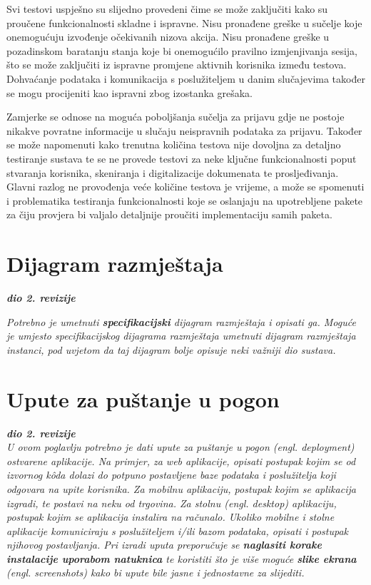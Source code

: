 			{Svi testovi uspješno su slijedno provedeni čime se može zaključiti kako su proučene funkcionalnosti skladne i ispravne. Nisu pronađene greške u sučelje koje onemogućuju izvođenje očekivanih nizova akcija. Nisu pronađene greške u pozadinskom baratanju stanja koje bi onemogućilo pravilno izmjenjivanja sesija, što se može zaključiti iz ispravne promjene aktivnih korisnika između testova. Dohvaćanje podataka i komunikacija s poslužiteljem u danim slučajevima također se mogu procijeniti kao ispravni zbog izostanka grešaka.}
				
			{Zamjerke se odnose na moguća poboljšanja sučelja za prijavu gdje ne postoje nikakve povratne informacije u slučaju neispravnih podataka za prijavu. Također se može napomenuti kako trenutna količina testova nije dovoljna za detaljno testiranje sustava te se ne provede testovi za neke ključne funkcionalnosti poput stvaranja korisnika, skeniranja i digitalizacije dokumenata te prosljeđivanja. Glavni razlog ne provođenja veće količine testova je vrijeme, a može se spomenuti i problematika testiranja funkcionalnosti koje se oslanjaju na upotrebljene pakete za čiju provjera bi valjalo detaljnije proučiti implementaciju samih paketa.}
			 
			\eject 
		
		
		\section{Dijagram razmještaja}
			
			\textbf{\textit{dio 2. revizije}}
			
			 \textit{Potrebno je umetnuti \textbf{specifikacijski} dijagram razmještaja i opisati ga. Moguće je umjesto specifikacijskog dijagrama razmještaja umetnuti dijagram razmještaja instanci, pod uvjetom da taj dijagram bolje opisuje neki važniji dio sustava.}
			
			\eject 
		
		\section{Upute za puštanje u pogon}
		
			\textbf{\textit{dio 2. revizije}}\\
		
			 \textit{U ovom poglavlju potrebno je dati upute za puštanje u pogon (engl. deployment) ostvarene aplikacije. Na primjer, za web aplikacije, opisati postupak kojim se od izvornog kôda dolazi do potpuno postavljene baze podataka i poslužitelja koji odgovara na upite korisnika. Za mobilnu aplikaciju, postupak kojim se aplikacija izgradi, te postavi na neku od trgovina. Za stolnu (engl. desktop) aplikaciju, postupak kojim se aplikacija instalira na računalo. Ukoliko mobilne i stolne aplikacije komuniciraju s poslužiteljem i/ili bazom podataka, opisati i postupak njihovog postavljanja. Pri izradi uputa preporučuje se \textbf{naglasiti korake instalacije uporabom natuknica} te koristiti što je više moguće \textbf{slike ekrana} (engl. screenshots) kako bi upute bile jasne i jednostavne za slijediti.}
			

